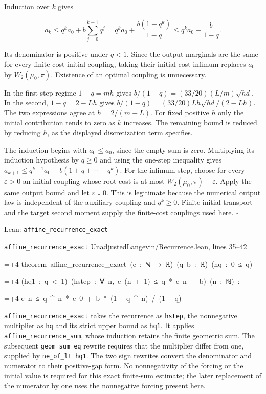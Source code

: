 \documentclass[11pt,a4paper]{article}
\newlength{\leancharwidth}
\newenvironment{leancode}{\par\smallskip\begingroup\ttfamily\footnotesize\raggedright
  \settowidth{\leancharwidth}{M}\setlength{\parskip}{0pt}\setlength{\parindent}{0pt}
  \frenchspacing}{\par\endgroup\smallskip}
\newcommand{\leanline}[2]{\hangindent=\dimexpr#1\leancharwidth+4\leancharwidth\relax
  \hangafter=1\noindent\hspace*{#1\leancharwidth}#2\par}
\newcommand{\leansource}[1]{\par{\footnotesize\color{leanmuted}#1}\par}
\newcommand{\leanlabel}[1]{\par\smallskip\noindent{\small\bfseries #1}\par}
\begin{document}
Induction over \(k\) gives

\[a_k\le q^ka_0+b\sum_{j=0}^{k-1}q^j
=q^ka_0+\frac{b(1-q^k)}{1-q}
\le q^ka_0+\frac b{1-q}.\]

Its denominator is positive under \(q<1\). Since the output marginals are the same for every finite-cost initial coupling, taking their initial-cost infimum replaces \(a_0\) by \(W_2(\mu_0,\pi)\). Existence of an optimal coupling is unnecessary.



In the first step regime \(1-q=mh\) gives \(b/(1-q)=(33/20)(L/m)\sqrt{hd}\). In the second, \(1-q=2-Lh\) gives \(b/(1-q)=(33/20)Lh\sqrt{hd}/(2-Lh)\). The two expressions agree at \(h=2/(m+L)\). For fixed positive \(h\) only the initial contribution tends to zero as \(k\) increases. The remaining bound is reduced by reducing \(h\), as the displayed discretization term specifies.




The induction begins with \(a_0\le a_0\), since the empty sum is zero. Multiplying its induction hypothesis by \(q\ge0\) and using the one-step inequality gives \(a_{k+1}\le q^{k+1}a_0+b(1+q+\cdots+q^k)\). For the infimum step, choose for every \(\varepsilon>0\) an initial coupling whose root cost is at most \(W_2(\mu_0,\pi)+\varepsilon\). Apply the same output bound and let \(\varepsilon\downarrow0\). This is legitimate because the numerical output law is independent of the auxiliary coupling and \(q^k\ge0\). Finite initial transport and the target second moment supply the finite-cost couplings used here. \(\square\)

\begin{leanbox}{Lean: \texttt{affine\_\allowbreak{}recurrence\_\allowbreak{}exact}}
\leansource{\texttt{affine\_\allowbreak{}recurrence\_\allowbreak{}exact} \quad UnadjustedLangevin/\allowbreak{}Recurrence.lean, lines 35–42}
\begin{leancode}
\leanline{0}{theorem\ affine\_recurrence\_exact\ (e\ :\ ℕ\ →\ ℝ)\ (q\ b\ :\ ℝ)\ (hq\ :\ 0\ ≤\ q)}
\leanline{4}{(hq1\ :\ q\ <\ 1)\ (hstep\ :\ ∀\ n,\ e\ (n\ +\ 1)\ ≤\ q\ *\ e\ n\ +\ b)\ (n\ :\ ℕ)\ :}
\leanline{4}{e\ n\ ≤\ q\ \textasciicircum{}\ n\ *\ e\ 0\ +\ b\ *\ (1\ -\ q\ \textasciicircum{}\ n)\ /\ (1\ -\ q)}
\end{leancode}
\leanlabel{How the Lean proof follows the argument}
\texttt{affine\_\allowbreak{}recurrence\_\allowbreak{}exact} takes the recurrence as \texttt{hstep}, the nonnegative multiplier as \texttt{hq} and its strict upper bound as \texttt{hq1}. It applies \texttt{affine\_\allowbreak{}recurrence\_\allowbreak{}sum}, whose induction retains the finite geometric sum. The subsequent \texttt{geom\_\allowbreak{}sum\_\allowbreak{}eq} rewrite requires that the multiplier differ from one, supplied by \texttt{ne\_\allowbreak{}of\_\allowbreak{}lt hq1}. The two sign rewrites convert the denominator and numerator to their positive-gap form. No nonnegativity of the forcing or the initial value is required for this exact finite-sum estimate; the later replacement of the numerator by one uses the nonnegative forcing present here.
\end{leanbox}
\end{document}
